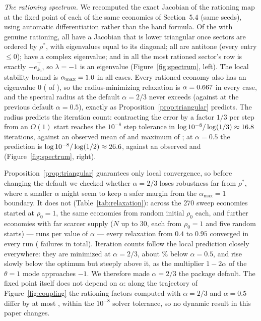 \documentclass[11pt]{article}
\begin{document}
\emph{The rationing spectrum.} We recomputed the exact Jacobian of the
rationing map at the fixed point of each of the same \JacNTrials{}
economies of Section~5.4 (same seeds), using automatic differentiation
rather than the hand formula. Of the \JacNRationed{} with genuine
rationing, all \JacNTriangular{} have a Jacobian that is lower
triangular once sectors are ordered by $\rho^*$, with eigenvalues equal
to its diagonal; all \JacNAntitone{} are antitone (every entry
$\le0$); \JacNComplex{} have a complex eigenvalue; and in all
\JacNMinusOne{} the most rationed sector's row is exactly $-e_{k_0}^{\top}$,
so $\lambda=-1$ is an eigenvalue (Figure~\ref{fig:spectrum}, left). The
local stability bound is $\alpha_{\max}=1.0$ in all
\JacNAlphaMaxOne{} cases. Every rationed economy also has an eigenvalue
$0$ (\JacNZero{} of \JacNRationed{}), so the radius-minimizing relaxation
is $\alpha=0.667$ in every case, and the spectral radius at
the default $\alpha=2/3$ never exceeds \JacRadiusDefaultMax{} (against
\JacRadiusHalfMax{} at the previous default $\alpha=0.5$), exactly as
Proposition~\ref{prop:triangular} predicts. The radius predicts the
iteration count: contracting the error by a factor $1/3$ per step from
an $O(1)$ start reaches the $10^{-8}$ step tolerance in
$\log10^{-8}/\log(1/3)\approx16.8$ iterations, against an
observed mean of \JacItersObsMean{} and maximum of \JacItersObsMax{};
at $\alpha=0.5$ the prediction is
$\log10^{-8}/\log(1/2)\approx26.6$, against an observed
\JacItersObsHalfMean{} and \JacItersObsHalfMax{}
(Figure~\ref{fig:spectrum}, right).

Proposition~\ref{prop:triangular} guarantees only local convergence, so
before changing the default we checked whether $\alpha=2/3$ loses
robustness far from $\rho^*$, where a smaller $\alpha$ might seem to
keep a safer margin from the $\alpha_{\max}=1$ boundary. It does not
(Table~\ref{tab:relaxation}): across the 270 sweep economies started at
$\rho_0=1$, the same economies from \RelaxNStarts{} random initial
$\rho_0$ each, and \RelaxNScarce{} further economies with far scarcer
supply ($N$ up to $30$, each from $\rho_0=1$ and five random starts) ---
\RelaxNRuns{} runs per value of $\alpha$ --- every relaxation from
$0.4$ to $0.95$ converged in every run (\RelaxNFailures{} failures in
total). Iteration counts follow the local prediction closely
everywhere: they are minimized at $\alpha=2/3$, about
\JacItersSavingPct\% below $\alpha=0.5$, and rise slowly below the
optimum but steeply above it, as the multiplier $1-2\alpha$ of the
$\theta=1$ mode approaches $-1$. We therefore made $\alpha=2/3$ the
package default. The fixed point itself does not depend on $\alpha$:
along the trajectory of Figure~\ref{fig:coupling} the rationing factors
computed with $\alpha=2/3$ and $\alpha=0.5$ differ by at most
\RelaxFigFourDiff{}, within the $10^{-8}$ solver tolerance, so no
dynamic result in this paper changes.
\end{document}
